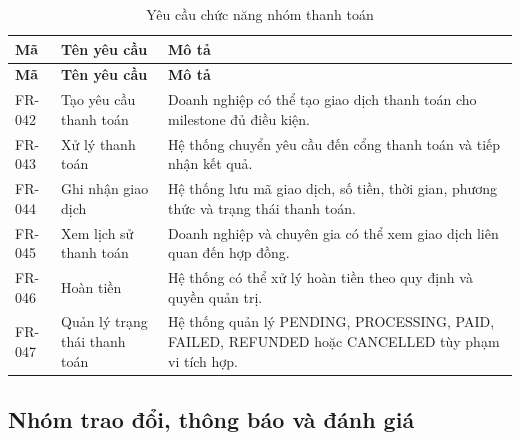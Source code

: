 \begin{longtable}{|p{2.0cm}|p{4.2cm}|p{7.6cm}|}
\caption{Yêu cầu chức năng nhóm thanh toán}
\label{tab:fr-payment} \\ \hline
\textbf{Mã} & \textbf{Tên yêu cầu} & \textbf{Mô tả} \\ \hline
\endfirsthead
\hline
\textbf{Mã} & \textbf{Tên yêu cầu} & \textbf{Mô tả} \\ \hline
\endhead

FR-042 & Tạo yêu cầu thanh toán & Doanh nghiệp có thể tạo giao dịch thanh toán cho milestone đủ điều kiện. \\ \hline
FR-043 & Xử lý thanh toán & Hệ thống chuyển yêu cầu đến cổng thanh toán và tiếp nhận kết quả. \\ \hline
FR-044 & Ghi nhận giao dịch & Hệ thống lưu mã giao dịch, số tiền, thời gian, phương thức và trạng thái thanh toán. \\ \hline
FR-045 & Xem lịch sử thanh toán & Doanh nghiệp và chuyên gia có thể xem giao dịch liên quan đến hợp đồng. \\ \hline
FR-046 & Hoàn tiền & Hệ thống có thể xử lý hoàn tiền theo quy định và quyền quản trị. \\ \hline
FR-047 & Quản lý trạng thái thanh toán & Hệ thống quản lý PENDING, PROCESSING, PAID, FAILED, REFUNDED hoặc CANCELLED tùy phạm vi tích hợp. \\ \hline
\end{longtable}

\subsection{Nhóm trao đổi, thông báo và đánh giá}

